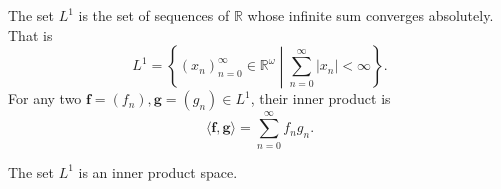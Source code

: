 \begin{definition}[$L^1$]
    The set $L^1$ is the set of sequences of $\mathbb{R}$ whose infinite sum converges absolutely.
    That is
    \begin{equation*}
        L^1 = \left\{ (x_n)_{n=0}^{\infty} \in \mathbb{R}^{\omega} \middle| \sum_{n=0}^{\infty} \lvert x_n \rvert < \infty \right\}.
    \end{equation*}
    For any two $\mathbf{f} = (f_n), \mathbf{g} = (g_n) \in L^1$, their inner product is
    \begin{equation*}
        \langle \mathbf{f}, \mathbf{g} \rangle = \sum\limits_{n=0}^{\infty} f_ng_n.
    \end{equation*}
\end{definition}
\begin{proposition}
    The set $L^1$ is an inner product space.
\end{proposition}
